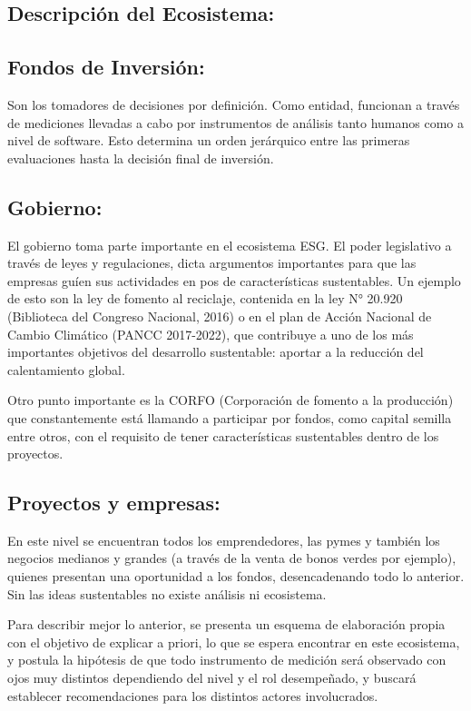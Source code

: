 \documentclass[11pt,letterpaper]{article}
\begin{document}
\subsection{Descripción del Ecosistema:}

\subsection{Fondos de Inversión:}

Son los tomadores de decisiones por definición. Como entidad, funcionan a través de mediciones llevadas a cabo por instrumentos de análisis tanto humanos como a nivel de software. Esto determina un orden jerárquico entre las primeras evaluaciones hasta la decisión final de inversión.

\subsection{Gobierno:}

El gobierno toma parte importante en el ecosistema ESG. El poder legislativo a través de leyes y regulaciones, dicta argumentos importantes para que las empresas guíen sus actividades en pos de características sustentables. Un ejemplo de esto son la ley de fomento al reciclaje, contenida en la ley N° 20.920 (Biblioteca del Congreso Nacional, 2016) o en el plan de Acción Nacional de Cambio Climático (PANCC 2017-2022), que contribuye a uno de los más importantes objetivos del desarrollo sustentable: aportar a la reducción del calentamiento global. 

Otro punto importante es la CORFO (Corporación de fomento a la producción) que constantemente está llamando a participar por fondos, como capital semilla entre otros, con el requisito de tener características sustentables dentro de los proyectos. 

\subsection{Proyectos y empresas:}
En este nivel se encuentran todos los emprendedores, las pymes y también los negocios medianos y grandes (a través de la venta de bonos verdes por ejemplo), quienes presentan una oportunidad a los fondos, desencadenando todo lo anterior. Sin las ideas sustentables no existe análisis ni ecosistema.

Para describir mejor lo anterior, se presenta un esquema de elaboración propia con el objetivo de explicar a priori, lo que se espera encontrar en este ecosistema, y postula la hipótesis de que todo instrumento de medición será observado con ojos muy distintos dependiendo del nivel y el rol desempeñado, y buscará establecer recomendaciones para los distintos actores involucrados.
\end{document}
